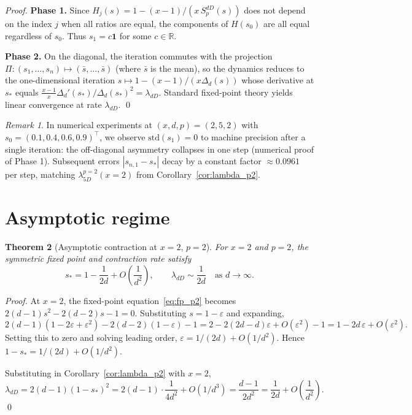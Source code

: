 \documentclass[11pt,a4paper]{article}
\newtheorem{theorem}{Theorem}
\theoremstyle{definition}
\theoremstyle{remark}
\newtheorem{remark}[theorem]{Remark}
\newcommand{\eps}{\varepsilon}
\newcommand{\R}{\mathbb{R}}
\newcommand{\one}{\mathbf{1}}
\begin{document}
\begin{proof}
\textbf{Phase 1.}  Since $H_j(s) = 1 - (x-1)/(x\, S_p^{dD}(s))$ does
not depend on the index $j$ when all ratios are equal, the components of
$H(s_0)$ are all equal regardless of $s_0$.  Thus $s_1 = c \one$ for
some $c \in \R$.

\textbf{Phase 2.}  On the diagonal, the iteration commutes with the
projection $\Pi : (s_1, \ldots, s_n) \mapsto (\bar{s}, \ldots, \bar{s})$
(where $\bar{s}$ is the mean), so the dynamics reduces to the
one-dimensional iteration $s \mapsto 1 - (x-1)/(x \Delta_d(s))$ whose
derivative at $s_*$ equals
$\frac{x-1}{x} \Delta_d'(s_*) / \Delta_d(s_*)^2 = \lambda_{dD}$.  Standard
fixed-point theory yields linear convergence at rate $\lambda_{dD}$. \qed
\end{proof}

\begin{remark}
In numerical experiments at $(x, d, p) = (2, 5, 2)$ with
$s_0 = (0.1, 0.4, 0.6, 0.9)^\top$, we observe $\mathrm{std}(s_1) = 0$ to
machine precision after a single iteration: the off-diagonal asymmetry
collapses in one step (numerical proof of Phase 1).  Subsequent errors
$|s_{n,1} - s_*|$ decay by a constant factor $\approx 0.0961$ per step,
matching $\lambda_{5D}^{p=2}(x=2)$ from Corollary~\ref{cor:lambda_p2}.
\end{remark}

\section{Asymptotic regime}
\label{sec:asymp}

\begin{theorem}[Asymptotic contraction at $x = 2$, $p = 2$]
\label{thm:asymp}
For $x = 2$ and $p = 2$, the symmetric fixed point and contraction rate
satisfy
\begin{equation}
  s_* = 1 - \frac{1}{2d} + O\!\left(\frac{1}{d^2}\right),
  \qquad
  \lambda_{dD} \sim \frac{1}{2d} \quad \text{as } d \to \infty.
\end{equation}
\end{theorem}

\begin{proof}
At $x = 2$, the fixed-point equation~\eqref{eq:fp_p2} becomes
$2(d-1) s^2 - 2(d-2) s - 1 = 0$.  Substituting $s = 1 - \eps$ and
expanding,
\[
  2(d-1)(1 - 2\eps + \eps^2) - 2(d-2)(1 - \eps) - 1
  = 2 - 2(2d - d) \eps + O(\eps^2) - 1
  = 1 - 2 d\, \eps + O(\eps^2).
\]
Setting this to zero and solving leading order, $\eps = 1/(2d) +
O(1/d^2)$.  Hence $1 - s_* = 1/(2d) + O(1/d^2)$.

Substituting in Corollary~\ref{cor:lambda_p2} with $x = 2$,
\[
  \lambda_{dD}
  = 2(d-1)(1-s_*)^2
  = 2(d-1) \cdot \frac{1}{4d^2} + O(1/d^3)
  = \frac{d-1}{2d^2}
  = \frac{1}{2d} + O\!\left(\frac{1}{d^2}\right).
\]
\qed
\end{proof}
\end{document}
